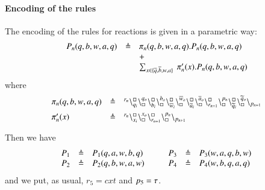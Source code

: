 \paragraph{Encoding of the rules}
The encoding of the rules for reactions is  given in a parametric way:
\[
\begin{array}{lcl}
P_n(q,b,w,a,q) & \triangleq & \pi_n(q,b,w,a,q).P_n(q,b,w,a,q)  \\
			&& +\\
			&& \sum_{x\in\{\overline{q},\overline{b},w,a\}}\ \pi'_n(x).P_n(q,b,w,a,q)\\
			\end{array}
			\]
			\noindent
			where
			\[
\begin{array}{lcl}
\pi_n(q,b,w,a,q) &\triangleq & {}^{r_n}\backslash_{q_i}^{\scriptstyle {\square}}\backslash_{\scriptstyle {\square}}^{q_o}
                                                    \backslash_{b_i}^{\scriptstyle {\square}}\backslash_{\scriptstyle {\square}}^{b_o}
                                                     \backslash_{\overline{w}_i}^{\scriptstyle {\square}}\backslash_{\scriptstyle {\square}}^{\overline{w}_o}
					        \backslash_{\overline{a}_i}^{\scriptstyle {\square}}\backslash_{\scriptstyle {\square}}^{\overline{a}_o}
					        \backslash_{r_{n+1}}^{\scriptstyle {\square}}\backslash_{\scriptstyle {\square}}^{p_n}
					        \backslash_{\widetilde{q}_i}^{\scriptstyle {\square}}\backslash_{\scriptstyle {\square}}^{\widetilde{q}_o}
			\backslash_{p_{n+1}}\\[6pt]
\pi'_n(x) &\triangleq &  {}^{r_n}\backslash_{x_i}^{\scriptstyle {\square}}\backslash_{\scriptstyle {\square}}^{x_o}\backslash_{r_{n+1}}^{\scriptstyle {\square}}\backslash_{\scriptstyle {\square}}^{p_n} \backslash_{p_{n+1}} 
\end{array}
\]

Then we have 
\[
\begin{array}{lcl @{\hspace{1cm}}lcl  }
P_1 & \defeq & P_1(q,a,w,b,q) & P_3 & \defeq & P_3(w,a,q,b,w)  \\
P_2 & \defeq & P_2(q,b,w,a,w) &P_4 & \defeq & P_4(w,b,q,a,q) 
\end{array}
\]
and we put, as usual,
$r_5 = \mathit{cxt}$ and  $p_5 = \tau$.

